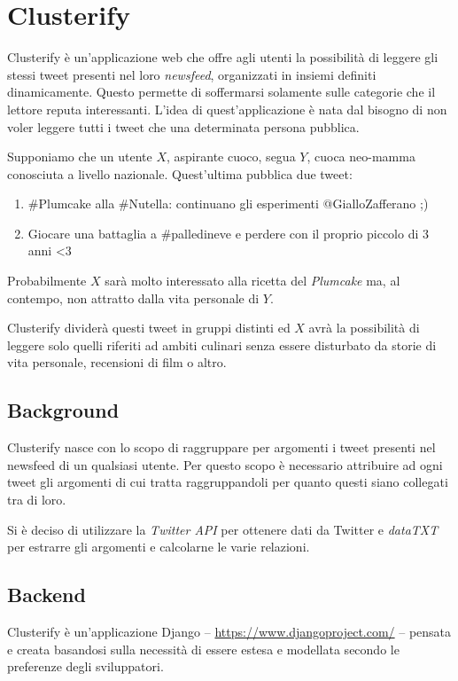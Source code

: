 \chapter{Clusterify}
	Clusterify è un'applicazione web che offre agli utenti la possibilità di leggere gli stessi tweet presenti nel loro \emph{newsfeed}, organizzati in insiemi definiti dinamicamente. Questo permette di soffermarsi solamente sulle categorie che il lettore reputa interessanti. L'idea di quest'applicazione è nata dal bisogno di non voler leggere tutti i tweet che una determinata persona pubblica. 

	Supponiamo che un utente $X$, aspirante cuoco, segua $Y$, cuoca neo-mamma conosciuta a livello nazionale. Quest'ultima pubblica due tweet:
	\begin{enumerate}
		\item \#Plumcake alla \#Nutella: continuano gli esperimenti @GialloZafferano ;)
		\item Giocare una battaglia a \#palledineve e perdere con il proprio piccolo di 3 anni <3
	\end{enumerate}
	Probabilmente $X$ sarà molto interessato alla ricetta del \emph{Plumcake} ma, al contempo, non attratto dalla vita personale di $Y$.

	Clusterify dividerà questi tweet in gruppi distinti ed $X$ avrà la possibilità di leggere solo quelli riferiti ad ambiti culinari senza essere disturbato da storie di vita personale, recensioni di film o altro.

\section{Background}
	Clusterify nasce con lo scopo di raggruppare per argomenti i tweet presenti nel newsfeed di un qualsiasi utente. Per questo scopo è necessario attribuire ad ogni tweet gli argomenti di cui tratta raggruppandoli per quanto questi siano collegati tra di loro. 

	Si è deciso di utilizzare la \emph{Twitter API} per ottenere dati da Twitter e \emph{dataTXT} per estrarre gli argomenti e calcolarne le varie relazioni.

	
	

\section{Backend}
	Clusterify è un'applicazione Django -- \url{https://www.djangoproject.com/} -- pensata e creata basandosi sulla necessità di essere estesa e modellata secondo le preferenze degli sviluppatori. %

